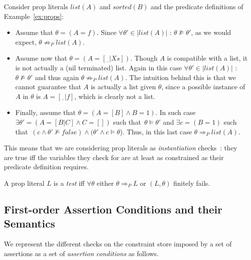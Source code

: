 \documentclass{llncs}
\begin{document}
\begin{example} 
\label{ex:props-more}
  Consider prop literals $list(A)$ and $sorted(B)$ and the predicate
  definitions of Example~\ref{ex:props}:
\vspace{-0.75em}
  \begin{itemize}
  \item
  Assume that $\theta= (A=f)$.
  Since $\forall \theta'\in |list(A)|$ : $\theta \not\models \theta'$,
  as we would expect, $\theta \not\Rightarrow_P list(A)$.
  
  \item
  Assume now that $\theta= (A=[\underline{~~}|Xs])$.  Though $A$ is
  compatible with a list, it is not actually a (nil terminated)
  list. Again in this case $\forall \theta'\in |list(A)|$ : $\theta
  \not\models \theta'$ and thus again $\theta \not\Rightarrow_P
  list(A)$. The intuition behind this is that we cannot guarantee that
  $A$ is actually a list given $\theta$, since a possible instance of
  $A$ in $\theta$ is $A=[\underline{~~}|f]$, which is clearly not a
  list.
  
  \item
  Finally, assume that $\theta=(A=[B]\wedge B=1)$.  In such case
  $\exists \theta'= (A=[B|C]\wedge C=[])$ such that\ $\theta \models
  \theta'$ and $\exists c = (B = 1)$ such that\ $(c\wedge \theta'
  \not\models false)\wedge (\theta'\wedge c\models \theta$).  Thus, in
  this last case $\theta \Rightarrow_P list(A)$.
  \end{itemize}
\end{example}

This means that we are considering prop literals as
\emph{instantiation}
checks~\cite{prog-glob-an,assert-lang-disciplbook-short}: they are
true iff the variables they check for are at least as constrained as
their predicate definition requires.

\begin{definition}
\label{def:test-literal}
  A prop literal $L$ is a \emph{test} iff $\forall \theta$ either
  $\theta \Rightarrow_P L$ or $(L,\theta)$ finitely fails.
\end{definition}



\subsection{First-order Assertion Conditions and their Semantics}

We represent the different checks on the constraint store imposed by a
set of assertions as a set of \emph{assertion conditions} as follows.
\end{document}
